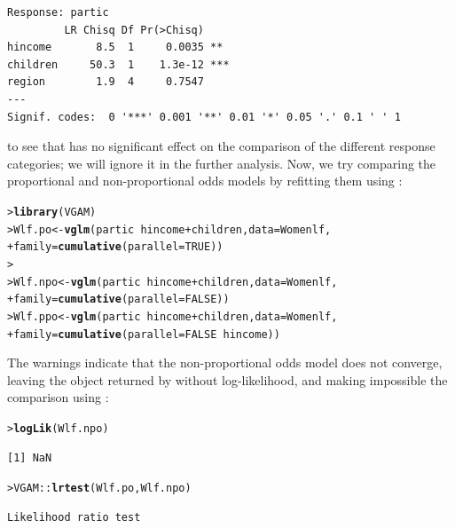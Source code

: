 \documentclass[10pt]{report}\usepackage[]{graphicx}\usepackage[]{color}
\makeatletter
\newcommand{\hlnum}[1]{\textcolor[rgb]{0.686,0.059,0.569}{#1}}%
\newcommand{\hlopt}[1]{\textcolor[rgb]{0,0,0}{#1}}%
\newcommand{\hlstd}[1]{\textcolor[rgb]{0.345,0.345,0.345}{#1}}%
\newcommand{\hlkwb}[1]{\textcolor[rgb]{0.69,0.353,0.396}{#1}}%
\newcommand{\hlkwc}[1]{\textcolor[rgb]{0.333,0.667,0.333}{#1}}%
\newcommand{\hlkwd}[1]{\textcolor[rgb]{0.737,0.353,0.396}{\textbf{#1}}}%
\newenvironment{kframe}{%
 \def\at@end@of@kframe{}%
 \ifinner\ifhmode%
  \def\at@end@of@kframe{\end{minipage}}%
  \begin{minipage}{\columnwidth}%
 \fi\fi%
 \def\FrameCommand##1{\hskip\@totalleftmargin \hskip-\fboxsep
 \colorbox{shadecolor}{##1}\hskip-\fboxsep
     \hskip-\linewidth \hskip-\@totalleftmargin \hskip\columnwidth}%
 \MakeFramed {\advance\hsize-\width
   \@totalleftmargin\z@ \linewidth\hsize
   \@setminipage}}%
 {\par\unskip\endMakeFramed%
 \at@end@of@kframe}
\newenvironment{knitrout}{}{} %
\renewenvironment{knitrout}{\small\renewcommand{\baselinestretch}{.85}}{} %
\makeatother
\begin{document}
\begin{Exercises}
\begin{ans}
\begin{knitrout}
\begin{kframe}
\begin{verbatim}
Response: partic
         LR Chisq Df Pr(>Chisq)    
hincome       8.5  1     0.0035 ** 
children     50.3  1    1.3e-12 ***
region        1.9  4     0.7547    
---
Signif. codes:  0 '***' 0.001 '**' 0.01 '*' 0.05 '.' 0.1 ' ' 1
\end{verbatim}
\end{kframe}
\end{knitrout}
    to see that  has no significant effect on the comparison of
    the different response categories; we will ignore it in the
    further analysis. Now, we try comparing the proportional and
    non-proportional odds models by refitting them using :
\begin{knitrout}\footnotesize
{}\color{fgcolor}\begin{kframe}
\begin{alltt}
\hlstd{> }\hlkwd{library}\hlstd{(VGAM)}
\hlstd{> }\hlstd{Wlf.po} \hlkwb{<-} \hlkwd{vglm}\hlstd{(partic} \hlopt{~} \hlstd{hincome} \hlopt{+} \hlstd{children,} \hlkwc{data} \hlstd{= Womenlf,}
\hlstd{+ }               \hlkwc{family} \hlstd{=} \hlkwd{cumulative}\hlstd{(}\hlkwc{parallel} \hlstd{=} \hlnum{TRUE}\hlstd{))}
\hlstd{> }
\hlstd{> }\hlstd{Wlf.npo} \hlkwb{<-} \hlkwd{vglm}\hlstd{(partic} \hlopt{~} \hlstd{hincome} \hlopt{+} \hlstd{children,} \hlkwc{data} \hlstd{= Womenlf,}
\hlstd{+ }                \hlkwc{family} \hlstd{=} \hlkwd{cumulative}\hlstd{(}\hlkwc{parallel} \hlstd{=} \hlnum{FALSE}\hlstd{))}
\hlstd{> }\hlstd{Wlf.ppo} \hlkwb{<-} \hlkwd{vglm}\hlstd{(partic} \hlopt{~} \hlstd{hincome} \hlopt{+} \hlstd{children,} \hlkwc{data} \hlstd{= Womenlf,}
\hlstd{+ }                \hlkwc{family} \hlstd{=} \hlkwd{cumulative}\hlstd{(}\hlkwc{parallel} \hlstd{=} \hlnum{FALSE} \hlopt{~} \hlstd{hincome))}
\end{alltt}
\end{kframe}
\end{knitrout}
    The warnings indicate that the non-proportional odds model does
    not converge, leaving the object returned by  without 
    log-likelihood, and making impossible the comparison using :
\begin{knitrout}\footnotesize
{}\color{fgcolor}\begin{kframe}
\begin{alltt}
\hlstd{> }\hlkwd{logLik}\hlstd{(Wlf.npo)}
\end{alltt}
\begin{verbatim}
[1] NaN
\end{verbatim}
\begin{alltt}
\hlstd{> }\hlstd{VGAM}\hlopt{::}\hlkwd{lrtest}\hlstd{(Wlf.po, Wlf.npo)}
\end{alltt}
\begin{verbatim}
Likelihood ratio test


\end{verbatim}
\end{kframe}
\end{knitrout}
\end{ans}
\end{Exercises}
\end{document}
